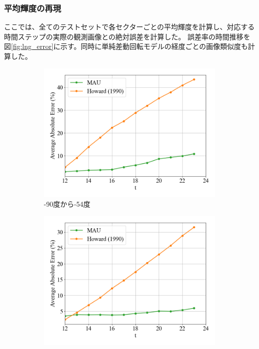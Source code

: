         \subsubsection{平均輝度の再現}
          ここでは、全てのテストセットで各セクターごとの平均輝度を計算し、対応する時間ステップの実際の観測画像との絶対誤差を計算した。
            誤差率の時間推移を図\ref{fig:lng_error}に示す。同時に単純差動回転モデルの経度ごとの画像類似度も計算した。
            \begin{figure}[htbp]
              \begin{subfigure}{0.5\textwidth}
                \centering
                \includegraphics[width=\textwidth]{figures/exp2/lng_error_1.png}
                \caption{-90度から-54度}
              \end{subfigure}%
              \begin{subfigure}{0.5\textwidth}
                \centering
                \includegraphics[width=\textwidth]{figures/exp2/lng_error_2.png}

\end{subfigure}
\end{figure}
